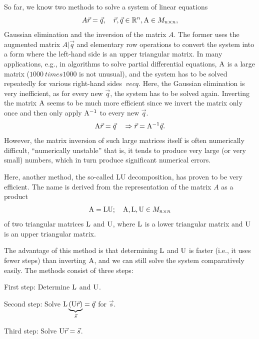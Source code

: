 \documentclass[
  letterpaper,
  DIV=11,
  numbers=noendperiod]{scrartcl}
\theoremstyle{remark}
\begin{document}
So far, we know two methods to solve a system of linear equations
\[A\vec{r} =  \vec{q},  \quad \vec{r}, \vec{q}\in \mathbb{R}^{n}, {\rm A}\in M_{n\times n},\]
Gaussian elimination and the inversion of the matrix \(A\). The former
uses the augmented matrix \(A|\vec{q}\) and elementary row operations to
convert the system into a form where the left-hand side is an upper
triangular matrix. In many applications, e.g., in algorithms to solve
partial differential equations, \({\rm A}\) is a large matrix
(\(1000 \ times 1000\) is not unusual), and the system has to be solved
repeatedly for various right-hand sides \(\ vec {q}\). Here, the
Gaussian elimination is very inefficient, as for every new \(\vec{q}\),
the system has to be solved again. Inverting the matrix \({\rm A}\)
seems to be much more efficient since we invert the matrix only once and
then only apply \({\rm A}^{-1}\) to every new \(\vec{q}\).
\[{\rm A} \vec{r} = \vec{q} \quad \Rightarrow \vec{r} =  {\rm A}^{-1}  \vec{q}.\]
However, the matrix inversion of such large matrices itself is often
numerically difficult, ``numerically unstable'' that is, it tends to
produce very large (or very small) numbers, which in turn produce
significant numerical errors.

Here, another method, the so-called LU decomposition, has proven to be
very efficient. The name is derived from the representation of the
matrix \(A\) as a product
\[{\rm A} = {\rm L}{\rm U} ;  \quad  {\rm A},  {\rm L}, {\rm U} \in M_{n\times n}\]
of two triangular matrices \({\rm L}\) and \({\rm U}\), where
\({\rm L}\) is a lower triangular matrix and \({\rm U}\) is an upper
triangular matrix.

The advantage of this method is that determining \({\rm L}\) and
\({\rm U}\) is faster (i.e., it uses fewer steps) than inverting
\({\rm A}\), and we can still solve the system comparatively easily. The
methods consist of three steps:

First step: Determine \({\rm L}\) and \({\rm U}\).

Second step: Solve
\({\rm L}\underbrace{({\rm U} \vec{r})}_{ \vec{s} }= \vec{q}\) for
\(\vec{s}\).

Third step: Solve \({\rm U} \vec{r} = \vec{s}\).
\end{document}

